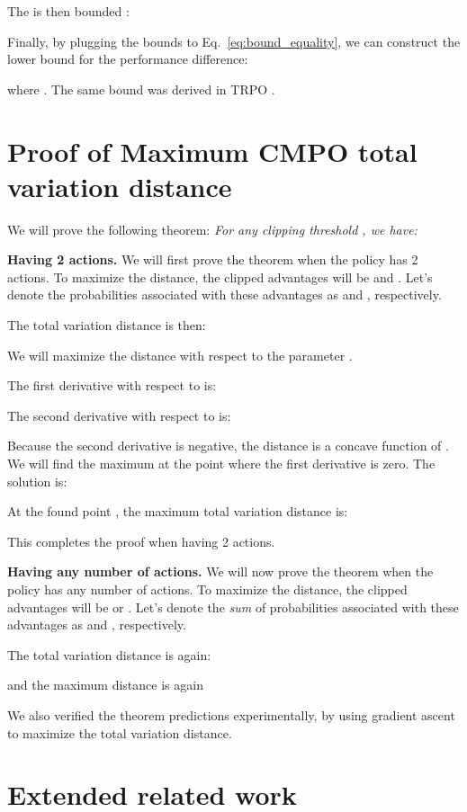 \documentclass{article}
\begin{document}
The  is then bounded \citep[see][Similar policies imply similar state visitations]{agarwal2020book}:


Finally, by plugging the bounds to Eq.~\ref{eq:bound_equality}, we can construct the lower bound for the performance difference:

where .
The same bound was derived in TRPO \citep{schulman2015trust}.
  
  
\section{Proof of Maximum CMPO total variation distance}
\label{sec:distance_proof}
We will prove the following theorem:
\emph{For any clipping threshold , we have:}


\textbf{Having 2 actions.} We will first prove the theorem when the policy has 2 actions. To maximize the distance, the clipped advantages will be  and . Let's denote the  probabilities associated with these advantages as  and , respectively.

The total variation distance is then:

We will maximize the distance with respect to the parameter .

The first derivative with respect to  is:


The second derivative with respect to  is:

Because the second derivative is negative, the distance is a concave function of . We will find the maximum at the point where the first derivative is zero. The solution is:


At the found point , the maximum total variation distance is:

This completes the proof when having 2 actions.

\textbf{Having any number of actions.} We will now prove the theorem when the policy has any number of actions. To maximize the distance, the clipped advantages will be  or . Let's denote the \emph{sum} of  probabilities associated with these advantages as  and , respectively.

The total variation distance is again:

and the maximum distance is again 

We also verified the theorem predictions experimentally, by using gradient ascent to maximize the total variation distance.

\section{Extended related work}
\label{sec:appendix_related_work}
\end{document}
